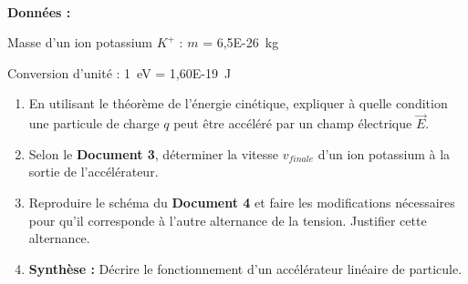 \documentclass[a4paper,11pt,fleqn]{article}%
\begin{document}
\\ \textbf{Données :}
\begin{itemize*}
	\item Masse d'un ion potassium $K^{+}$ : $m$ = \SI{6,5E-26}{\kilo \gram}
	\item Conversion d'unité : \SI{1}{eV} = \SI{1,60E-19}{\joule}
\end{itemize*}
\begin{enumerate}
	\item En utilisant le théorème de l'énergie cinétique, expliquer à quelle condition une particule de charge $q$ peut être accéléré par un champ électrique $\vec{E}$.
	\item Selon le \textbf{Document 3}, déterminer la vitesse $v_{finale}$ d'un ion potassium  à la sortie de l'accélérateur.
	\item Reproduire le schéma du \textbf{Document 4} et faire les modifications nécessaires pour qu'il corresponde à l'autre alternance de la tension. Justifier cette alternance.
	\item \textbf{Synthèse : } Décrire le fonctionnement d'un accélérateur linéaire de particule.
\end{enumerate}
\end{document}
